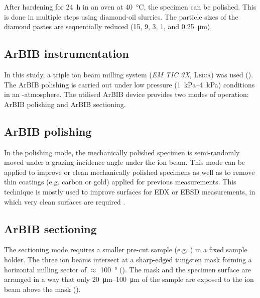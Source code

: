 After hardening for \qty{24}{\hour} in an oven at \qty{40}{\celsius}, the specimen can be polished.
This is done in multiple steps using diamond-oil slurries.
The particle sizes of the diamond pastes are sequentially reduced (\num{15}, \num{9}, \num{3}, \num{1}, and \qty{0.25}{\micro\meter}).

\subsection[Argon broad ion beam instrumentation]{\Acl*{ArBIB} instrumentation}

In this study, a triple ion beam milling system (\textit{EM TIC 3X}, \textsc{Leica}) was used ().
The \ac{ArBIB} polishing is carried out under low pressure (\qtyrange{1}{4}{\kilo\pascal}) conditions in an -atmosphere.
The utilised \ac{ArBIB} device provides two modes of operation: \ac{ArBIB} polishing and \ac{ArBIB} sectioning.

\subsection{\acs*{ArBIB} polishing}
\label{sec:bib_pol_moving}

In the polishing mode, the mechanically polished specimen is semi-randomly moved under a grazing incidence angle under the  ion beam.
This mode can be applied to improve or clean mechanically polished specimens as well as to remove thin coatings (e.g. carbon or gold) applied for previous measurements.
This technique is mostly used to improve surfaces for \ac{EDX} or \ac{EBSD} measurements, in which very clean surfaces are required \cite{rossler.2017,rossler.2022}.

\subsection{\acs*{ArBIB} sectioning}
\label{sec:bib_pol_fixed}

The sectioning mode requires a smaller pre-cut sample (e.g. ) in a fixed sample holder.
The three  ion beams intersect at a sharp-edged tungsten mask forming a horizontal milling sector of $\approx$ \qty{100}{\degree} ().
The mask and the specimen surface are arranged in a way that only \qtyrange{20}{100}{\micro\meter} of the sample are exposed to the ion beam above the mask ().

